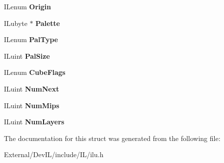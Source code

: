 \begin{DoxyCompactItemize}
\item 
\hypertarget{structILinfo_ac6c29ee25a953e3241e2aea2b33c4729}{
ILenum {\bfseries Origin}}
\label{structILinfo_ac6c29ee25a953e3241e2aea2b33c4729}

\item 
\hypertarget{structILinfo_aba4b972c5ce55e46ec329e8064003daa}{
ILubyte $\ast$ {\bfseries Palette}}
\label{structILinfo_aba4b972c5ce55e46ec329e8064003daa}

\item 
\hypertarget{structILinfo_ab505e99ad9677eec785a11533bfa5d73}{
ILenum {\bfseries PalType}}
\label{structILinfo_ab505e99ad9677eec785a11533bfa5d73}

\item 
\hypertarget{structILinfo_adaae3e63a61a73bf3c2a3092053763ef}{
ILuint {\bfseries PalSize}}
\label{structILinfo_adaae3e63a61a73bf3c2a3092053763ef}

\item 
\hypertarget{structILinfo_a89fb88cd2ce7abbed0b5911173f20d84}{
ILenum {\bfseries CubeFlags}}
\label{structILinfo_a89fb88cd2ce7abbed0b5911173f20d84}

\item 
\hypertarget{structILinfo_ad1201a015dd266f557eccc97ed2e7c05}{
ILuint {\bfseries NumNext}}
\label{structILinfo_ad1201a015dd266f557eccc97ed2e7c05}

\item 
\hypertarget{structILinfo_aebc89ad01ce03ce249a33ea099c4a560}{
ILuint {\bfseries NumMips}}
\label{structILinfo_aebc89ad01ce03ce249a33ea099c4a560}

\item 
\hypertarget{structILinfo_a444c6ff9c4ac659a376a65ba55606fff}{
ILuint {\bfseries NumLayers}}
\label{structILinfo_a444c6ff9c4ac659a376a65ba55606fff}

\end{DoxyCompactItemize}


The documentation for this struct was generated from the following file:\begin{DoxyCompactItemize}
\item 
External/DevIL/include/IL/ilu.h\end{DoxyCompactItemize}
